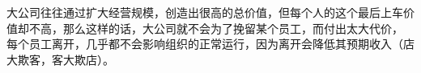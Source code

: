 \documentclass[12pt, a4paper]{article} %
\begin{document}
\begin{CJK*}{UTF8}{gbsn}
        大公司往往通过扩大经营规模，创造出很高的总价值，但每个人的这个最后上车价值却不高，那么这样的话，大公司就不会为了挽留某个员工，而付出太大代价，
        每个员工离开，几乎都不会影响组织的正常运行，因为离开会降低其预期收入（店大欺客，客大欺店）。





















    \end{CJK*}
\end{document}
